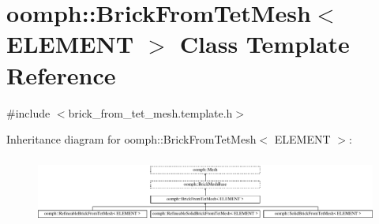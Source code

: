 \hypertarget{classoomph_1_1BrickFromTetMesh}{}\section{oomph\+:\+:Brick\+From\+Tet\+Mesh$<$ E\+L\+E\+M\+E\+NT $>$ Class Template Reference}
\label{classoomph_1_1BrickFromTetMesh}


{\ttfamily \#include $<$brick\+\_\+from\+\_\+tet\+\_\+mesh.\+template.\+h$>$}

Inheritance diagram for oomph\+:\+:Brick\+From\+Tet\+Mesh$<$ E\+L\+E\+M\+E\+NT $>$\+:\begin{figure}[H]
\begin{center}
\leavevmode
\includegraphics[height=2.202557cm]{classoomph_1_1BrickFromTetMesh}
\end{center}
\end{figure}
